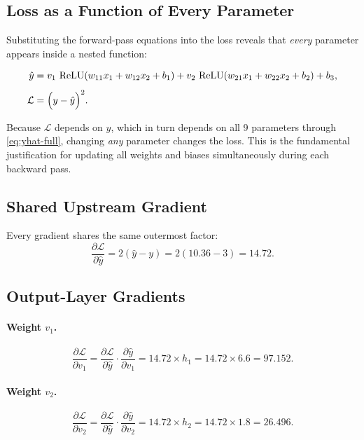 \documentclass[12pt,a4paper]{article}
\newcommand{\Loss}{\mathcal{L}}
\newcommand{\ReLU}{\operatorname{ReLU}}
\newcommand{\yhat}{\hat{y}}
\newcommand{\pderiv}[2]{\dfrac{\partial #1}{\partial #2}}
\begin{document}
\subsection{Loss as a Function of Every Parameter}
\label{sec:loss-fn}

Substituting the forward-pass equations into the loss reveals that
\emph{every} parameter appears inside a nested function:

\begin{align}
  \yhat &= v_1\,\ReLU(w_{11}x_1 + w_{12}x_2 + b_1)
         + v_2\,\ReLU(w_{21}x_1 + w_{22}x_2 + b_2)
         + b_3, \label{eq:yhat-full}\\[4pt]
  \Loss &= \Bigl(y - \yhat\Bigr)^2. \label{eq:loss-full}
\end{align}

\begin{keyinsight}[title=Why update every parameter?]
Because $\Loss$ depends on $\yhat$, which in turn depends on all 9 parameters
through \cref{eq:yhat-full}, changing \emph{any} parameter changes the loss.
This is the fundamental justification for updating all weights and biases
simultaneously during each backward pass.
\end{keyinsight}

\subsection{Shared Upstream Gradient}

Every gradient shares the same outermost factor:
\begin{equation}
  \pderiv{\Loss}{\yhat} = 2(\yhat - y) = 2(10.36 - 3) = 14.72.
  \label{eq:dL-dyhat}
\end{equation}

\subsection{Output-Layer Gradients}

\paragraph{Weight $v_1$.}
\begin{equation}
  \pderiv{\Loss}{v_1}
    = \pderiv{\Loss}{\yhat}\cdot\pderiv{\yhat}{v_1}
    = 14.72 \times h_1
    = 14.72 \times 6.6 = \mathbf{97.152}.
  \label{eq:grad-v1}
\end{equation}

\paragraph{Weight $v_2$.}
\begin{equation}
  \pderiv{\Loss}{v_2}
    = \pderiv{\Loss}{\yhat}\cdot\pderiv{\yhat}{v_2}
    = 14.72 \times h_2
    = 14.72 \times 1.8 = \mathbf{26.496}.
  \label{eq:grad-v2}
\end{equation}
\end{document}
